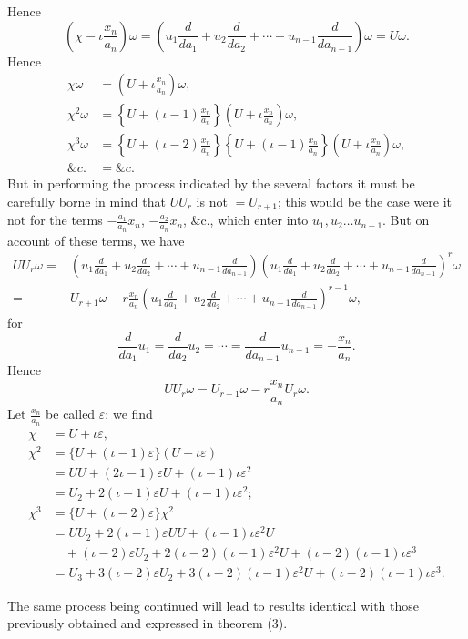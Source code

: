 \documentclass[11pt]{article}
\newcommand{\sourcepage}[1]{\marginpar{\scriptsize p.~#1}}
\newcommand{\eps}{\varepsilon}
\begin{document}
{{\sourcepage{168}
Hence
\[
\left(\chi-\iota\frac{x_n}{a_n}\right)\omega
=\left(u_1\frac{d}{da_1}+u_2\frac{d}{da_2}+\cdots+u_{n-1}\frac{d}{da_{n-1}}\right)\omega=U\omega.
\]
Hence
\[
\begin{aligned}
\chi\omega&=\left(U+\iota\frac{x_n}{a_n}\right)\omega,\\
\chi^2\omega&=\left\{U+(\iota-1)\frac{x_n}{a_n}\right\}\left(U+\iota\frac{x_n}{a_n}\right)\omega,\\
\chi^3\omega&=\left\{U+(\iota-2)\frac{x_n}{a_n}\right\}\left\{U+(\iota-1)\frac{x_n}{a_n}\right\}\left(U+\iota\frac{x_n}{a_n}\right)\omega,\\
\&c.&=\&c.
\end{aligned}
\]
But in performing the process indicated by the several factors it must be carefully borne in mind that $UU_r$ is not $=U_{r+1}$; this would be the case were it not for the terms $-\frac{a_1}{a_n}x_n$, $-\frac{a_2}{a_n}x_n$, \&c., which enter into $u_1,u_2\ldots u_{n-1}$. But on account of these terms, we have
\[
\begin{aligned}
UU_r\omega={}&\left(u_1\frac{d}{da_1}+u_2\frac{d}{da_2}+\cdots+u_{n-1}\frac{d}{da_{n-1}}\right)
\left(u_1\frac{d}{da_1}+u_2\frac{d}{da_2}+\cdots+u_{n-1}\frac{d}{da_{n-1}}\right)^r\omega\\
={}&U_{r+1}\omega-r\frac{x_n}{a_n}\left(u_1\frac{d}{da_1}+u_2\frac{d}{da_2}+\cdots+u_{n-1}\frac{d}{da_{n-1}}\right)^{r-1}\omega,
\end{aligned}
\]
for
\[
 \frac{d}{da_1}u_1=\frac{d}{da_2}u_2=\cdots=\frac{d}{da_{n-1}}u_{n-1}=-\frac{x_n}{a_n}.
\]
Hence
\[
 UU_r\omega=U_{r+1}\omega-r\frac{x_n}{a_n}U_r\omega.
\]
Let $\frac{x_n}{a_n}$ be called $\eps$; we find
\[
\begin{aligned}
\chi&=U+\iota\eps,\\
\chi^2&=\{U+(\iota-1)\eps\}(U+\iota\eps)\\
&=UU+(2\iota-1)\eps U+(\iota-1)\iota\eps^2\\
&=U_2+2(\iota-1)\eps U+(\iota-1)\iota\eps^2;\\
\chi^3&=\{U+(\iota-2)\eps\}\chi^2\\
&=UU_2+2(\iota-1)\eps UU+(\iota-1)\iota\eps^2U\\
&\quad+(\iota-2)\eps U_2+2(\iota-2)(\iota-1)\eps^2U+(\iota-2)(\iota-1)\iota\eps^3\\
&=U_3+3(\iota-2)\eps U_2+3(\iota-2)(\iota-1)\eps^2U+(\iota-2)(\iota-1)\iota\eps^3.
\end{aligned}
\]

\sourcepage{169}
The same process being continued will lead to results identical with those previously obtained and expressed in theorem (3).

}}
\end{document}
